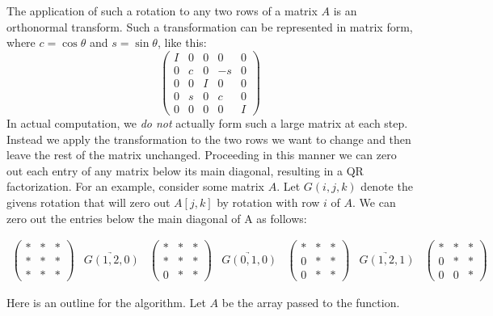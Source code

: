 The application of such a rotation to any two rows of a matrix $A$ is an orthonormal transform.
Such a transformation can be represented in matrix form, where $c = \cos \theta$ and $s = \sin \theta$, like this:
\begin{equation*}
\begin{pmatrix}
I & 0 & 0 & 0 & 0 \\
0 & c & 0 & -s & 0 \\
0 & 0 & I & 0 & 0 \\
0 & s & 0 & c & 0 \\
0 & 0 & 0 & 0 & I
\end{pmatrix}
\end{equation*}
In actual computation, we \emph{do not} actually form such a large matrix at each step.
Instead we apply the transformation to the two rows we want to change and then leave the rest of the matrix unchanged.
Proceeding in this manner we can zero out each entry of any matrix below its main diagonal, resulting in a QR factorization.
For an example, consider some matrix $A$.
Let $G \left( i, j, k \right)$ denote the givens rotation that will zero out $A \left[ j, k \right]$ by rotation with row $i$ of $A$.
We can zero out the entries below the main diagonal of A as follows:

\[
\begin{array}{ccccccc}
\begin{pmatrix}
*&*&*\\
*&*&*\\
*&*&*
\end{pmatrix}
&
\underrightarrow{G(1,2,0)}
&\begin{pmatrix}
*&*&*\\
*&*&*\\
0&*&*
\end{pmatrix}
&
\underrightarrow{G(0,1,0)}
&\begin{pmatrix}
*&*&*\\
0&*&*\\
0&*&*
\end{pmatrix}
&
\underrightarrow{G(1,2,1)}
&\begin{pmatrix}
*&*&*\\
0&*&*\\
0&0&*
\end{pmatrix}
\end{array}
\]

Here is an outline for the algorithm.
Let $A$ be the array passed to the function.

